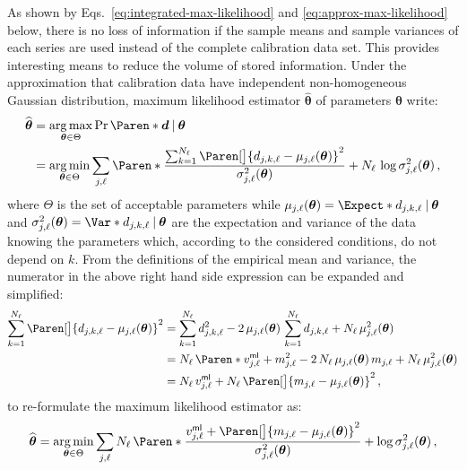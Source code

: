 \documentclass[a4paper,11pt,twoside]{scrartcl}
\newcommand*{\delimsize}{}
\newcommand*{\Given}{\:\delimsize\vert\:} %
\DeclareMathOperator*{\argmin}{arg\,min}
\DeclareMathOperator*{\argmax}{arg\,max}
\newcommand*{\Tag}[1]{\mathsf{#1}}
\newcommand*{\estim}[1]{\widehat{#1}}
\newcommand*{\V}[1]{\boldsymbol{#1}}   %
\theoremstyle{plain} %
\theoremstyle{definition}
\theoremstyle{remark}
\begin{document}
As shown by Eqs.~\eqref{eq:integrated-max-likelihood} and
\eqref{eq:approx-max-likelihood} below, there is no loss of information if the
sample means and sample variances of each series are used instead of the
complete calibration data set.  This provides interesting means to reduce the
volume of stored information.  Under the approximation that calibration data
have independent non-homogeneous Gaussian distribution, maximum likelihood
estimator $\estim{\V\theta}$ of parameters $\V\theta$ write:
\begin{align}
  \estim{\V\theta}
  &= \argmax_{\V\theta \in \Theta} \Pr\Paren*{\V d\Given \V\theta} \notag \\
  &= \argmin_{\V\theta \in \Theta} \sum_{j,\ell}
  \Paren*{
    \frac{
      \sum_{k=1}^{N_\ell} \Paren[\big]{d_{j,k,\ell} - \mu_{j,\ell}(\V\theta)}^2
    }{
      \sigma_{j,\ell}^2(\V\theta)
    }
    + N_\ell\,\log\sigma_{j,\ell}^2(\V\theta)
  } \, ,
\end{align}
where $\Theta$ is the set of acceptable parameters while
$\mu_{j,\ell}(\V\theta) = \Expect*{d_{j,k,\ell}\Given\V\theta}$ and
$\sigma_{j,\ell}^2(\V\theta) = \Var*{d_{j,k,\ell}\Given\V\theta}$ are the
expectation and variance of the data knowing the parameters which, according to
the considered conditions, do not depend on $k$.  From the definitions of the
empirical mean and variance, the numerator in the above right hand side
expression can be expanded and simplified:
\begin{align}
  \sum_{k=1}^{N_\ell} \Paren[\big]{d_{j,k,\ell} - \mu_{j,\ell}(\V\theta)}^2
  &= \sum_{k=1}^{N_\ell} d_{j,k,\ell}^2
   - 2\,\mu_{j,\ell}(\V\theta)\,\sum_{k=1}^{N_\ell} d_{j,k,\ell}
   + N_{\ell} \, \mu_{j,\ell}^2(\V\theta) \notag\\
  &= N_\ell\,\Paren*{v_{j,\ell}^\Tag{ml} + m_{j,\ell}^2}
   - 2\,N_{\ell}\,\mu_{j,\ell}(\V\theta)\,m_{j,\ell}
   + N_{\ell} \, \mu_{j,\ell}^2(\V\theta) \notag\\
  &= N_\ell\,v_{j,\ell}^\Tag{ml} + N_\ell\,
  \Paren[\big]{m_{j,\ell} - \mu_{j,\ell}(\V\theta)}^2 \,,
\end{align}
to re-formulate the maximum likelihood estimator as:
\begin{equation}
  \estim{\V\theta}
  = \argmin_{\V\theta \in \Theta} \sum_{j,\ell} N_\ell\,
  \Paren*{
    \frac{
      v_{j,\ell}^\Tag{ml}
      + \Paren[\big]{m_{j,\ell} - \mu_{j,\ell}(\V\theta)}^2
    }{
      \sigma_{j,\ell}^2(\V\theta)
    }
    + \log\sigma_{j,\ell}^2(\V\theta)
  } \, ,
  \label{eq:integrated-max-likelihood}
\end{equation}
\end{document}
